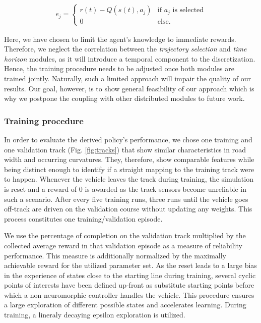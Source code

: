 \begin{align}
e_j = \begin{cases}
r(t) - Q(s(t),a_j) & \text{if } a_j \text{ is selected}\\
0 & \text{else}.
\end{cases}
\end{align}

Here, we have chosen to limit the agent's knowledge to immediate rewards.
Therefore, we neglect the correlation between the \emph{trajectory selection} and \emph{time horizon} modules, as it will introduce a temporal component to the discretization.
Hence, the training procedure needs to be adjusted once both modules are trained jointly.
Naturally, such a limited approach will impair the quality of our results.
Our goal, however, is to show general feasibility of our approach which is why we postpone the coupling with other distributed modules to future work.

\subsubsection{Training procedure}%
\label{ssubsec:training_procedure}

In order to evaluate the derived policy's performance, we chose one training and one validation track (Fig. \ref{fig:tracks}) that show similar characteristics in road width and occurring curvatures. They, therefore, show comparable features while being distinct enough to identify if a straight mapping to the training track were to happen.
Whenever the vehicle leaves the track during training, the simulation is reset and a reward of \num{0} is awarded as the track sensors become unreliable in such a scenario.
After every five training runs, three runs until the vehicle goes off-track are driven on the validation course without updating any weights. This process constitutes one training/validation episode.

We use the percentage of completion on the validation track multiplied by the collected average reward in that validation episode as a measure of reliability performance. 
This measure is additionally normalized by the maximally achievable reward for the utilized parameter set.
As the reset leads to a large bias in the experience of states close to the starting line during training, several cyclic points of interests have been defined up-front as substitute starting points before which a non-neuromorphic controller handles the vehicle.
This procedure ensures a large exploration of different possible states and accelerates learning. 
During training, a lineraly decaying epsilon exploration is utilized.

